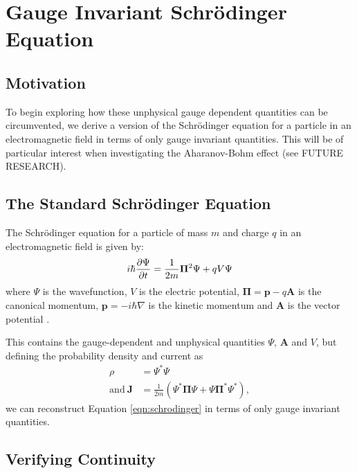 \section{Gauge Invariant Schr\"odinger Equation}
\label{sec:gise}

\subsection{Motivation}

To begin exploring how these unphysical gauge dependent quantities can be
circumvented, we derive a version of the Schr\"odinger equation for a particle
in an electromagnetic field in terms of only gauge invariant quantities. This
will be of particular interest when investigating the Aharanov-Bohm effect (see
FUTURE RESEARCH).

\subsection{The Standard Schr\"odinger Equation}

The Schr\"odinger equation for a particle of mass $m$ and charge $q$ in an
electromagnetic field is given by:
\begin{align}
    i \hbar \frac{\partial \Psi}{\partial t} = \frac{1}{2m}\mathbf{\Pi}^2 \Psi + qV \Psi
    \label{eqn:schrodinger}
\end{align}
where $\Psi$ is the wavefunction, $V$ is the electric potential, $\mathbf{\Pi} =
\mathbf{p} - q\mathbf{A}$ is the canonical momentum, $\mathbf{p} = - i \hbar
\nabla$ is the kinetic momentum and $\mathbf{A}$ is the vector potential
\cite[Chapter 4]{aharonov-rohrlich}\cite[Page 456]{landau-lifshitz-quantum}.

This contains the gauge-dependent and unphysical quantities $\Psi$, $\mathbf{A}$
and $V$, but defining the probability density and current as
\begin{align}
    \rho &= \Psi^*\Psi \\
    \mathrm{and}~ \mathbf{J} &= \frac{1}{2m}\left( \Psi^* \mathbf{\Pi}
        \Psi + \Psi \mathbf{\Pi}^* \Psi^* \right),
\end{align}
we can reconstruct Equation \ref{eqn:schrodinger} in terms of only gauge
invariant quantities.

\subsection{Verifying Continuity}

